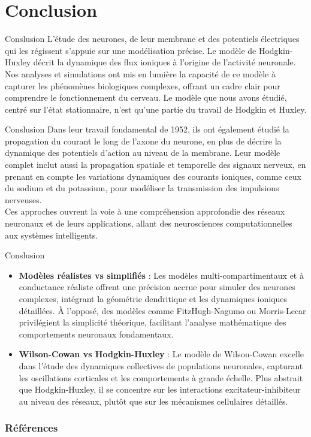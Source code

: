 \documentclass[10pt,french]{beamer}
\begin{document}
\section{Conclusion}
	
	\begin{frame}{Conslusion}
		L’étude des neurones, de leur membrane et des potentiels électriques qui les régissent s’appuie sur une modélisation précise. Le modèle de Hodgkin-Huxley décrit la dynamique des flux ioniques à l’origine de l’activité neuronale. Nos analyses et simulations ont mis en lumière la capacité de ce modèle à capturer les phénomènes biologiques complexes, offrant un cadre clair pour comprendre le fonctionnement du cerveau.
		Le modèle que nous avons étudié, centré sur l’état stationnaire, n’est qu’une partie du travail de Hodgkin et Huxley.
	\end{frame}
	
	\begin{frame}{Conslusion}
		Dans leur travail fondamental de 1952, ils ont également étudié la propagation du courant le long de l’axone du neurone, en plus de décrire la dynamique des potentiels d’action au niveau de la membrane. Leur modèle complet inclut aussi la propagation spatiale et temporelle des signaux nerveux, en prenant en compte les variations dynamiques des courants ioniques, comme ceux du sodium et du potassium, pour modéliser la transmission des impulsions nerveuses.\\
		Ces approches ouvrent la voie à une compréhension approfondie des réseaux neuronaux et de leurs applications, allant des neurosciences computationnelles aux systèmes intelligents.
	\end{frame}
	
	\begin{frame}{Conslusion}
		\begin{itemize}
			\item \textbf{Modèles réalistes vs simplifiés} : Les modèles multi-compartimentaux et à conductance réaliste offrent une précision accrue pour simuler des neurones complexes, intégrant la géométrie dendritique et les dynamiques ioniques détaillées. À l’opposé, des modèles comme FitzHugh-Nagumo ou Morris-Lecar privilégient la simplicité théorique, facilitant l’analyse mathématique des comportements neuronaux fondamentaux.
			\item \textbf{Wilson-Cowan vs Hodgkin-Huxley} : Le modèle de Wilson-Cowan excelle dans l’étude des dynamiques collectives de populations neuronales, capturant les oscillations corticales et les comportements à grande échelle. Plus abstrait que Hodgkin-Huxley, il se concentre sur les interactions excitateur-inhibiteur au niveau des réseaux, plutôt que sur les mécanismes cellulaires détaillés.
		\end{itemize}
	\end{frame}
	
	\begin{frame}[allowframebreaks]
		\frametitle{Références}
		
		
	\end{frame}
\end{document}

